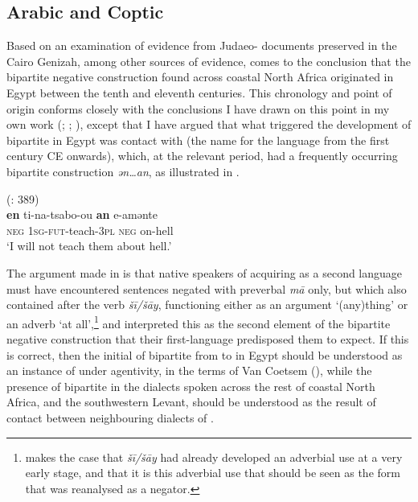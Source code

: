 \documentclass[output=paper]{langsci/langscibook}
\begin{document}
\subsection{Arabic and Coptic}
Based on an examination of evidence from Judaeo- documents preserved in the Cairo Genizah, among other sources of evidence, \citet{Diem2014} comes to the conclusion that the  bipartite negative construction found across coastal North Africa originated in Egypt between the tenth and eleventh centuries. This chronology and point of origin conforms closely with the conclusions I have drawn on this point in my own work (\citealt{Lucas2007}; \citeyear{Lucas2009}; \citealt{LucasLash2010}), except that I have argued that what triggered the development of bipartite  in Egypt was contact with  (the name for the  language from the first century CE onwards), which, at the relevant period, had a frequently occurring bipartite construction \textit{ən…an}, as illustrated in .

\ea\label{coptic}
{        (\citealt{LucasLash2010}: 389)}\\
\gll \textbf{en} ti-na-tsabo-ou \textbf{an} e-amənte\\
     \textsc{neg} \textsc{1sg-fut-}teach-\textsc{3pl} \textsc{neg} on-hell\\
\glt ‘I will not teach them about hell.’
\z

The argument made in \citet{LucasLash2010} is that native speakers of  acquiring  as a second language must have encountered sentences negated with preverbal \textit{mā} only, but which also contained after the verb \textit{šī/šāy}, functioning either as an argument ‘(any)thing’ or an adverb ‘at all’,\footnote{\citet{Diem2014} makes the case that \textit{šī/šāy} had already developed an adverbial use at a very early stage, and that it is this adverbial use that should be seen as the form that was reanalysed as a negator.} and interpreted this as the second element of the bipartite negative construction that their first-language  predisposed them to expect. If this is correct, then the initial  of bipartite  from  to  in Egypt should be understood as an instance of  under  agentivity, in the terms of Van Coetsem (\citeyear{VanCoetsem1988,VanCoetsem2000}), while the presence of bipartite  in the dialects spoken across the rest of coastal North Africa, and the southwestern Levant, should be understood as the result of contact between neighbouring dialects of .
\end{document}

